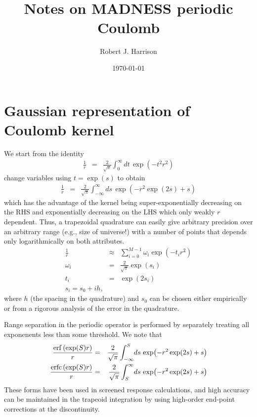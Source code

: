 \documentclass[12pt]{article}
\title{Notes on MADNESS periodic Coulomb}
\date{\today}
\author{Robert J. Harrison}
\DeclareMathOperator{\erfc}{erfc}
\begin{document}
\maketitle

\section{Gaussian representation of Coulomb kernel}

We start from the identity
\begin{eqnarray}
  \frac{1}{r} & = & \frac{2}{\sqrt{\pi}} \int_0^\infty \! dt \, \exp(-t^2 r^2) 
\end{eqnarray}
change variables using $t=\exp(s)$ to obtain
\begin{eqnarray}
  \frac{1}{r} & = & \frac{2}{\sqrt{\pi}} \int_{-\infty}^\infty \! ds \,\exp(-r^2 \exp(2s) + s)
\end{eqnarray}
which has the advantage of the kernel being super-exponentially decreasing on the RHS and exponentially decreasing on the LHS which only weakly $r$ dependent.  Thus, a trapezoidal quadrature can easily give arbitrary precision over an arbitrary range (e.g., size of universe!) with a number of points that depends only logarithmically on both attributes.
\begin{eqnarray}
  \frac{1}{r} & \approx & \sum_{i=0}^{M-1} \omega_i \exp(-t_i r^2) \\
  \omega_i & = & \frac{2}{\sqrt{\pi}} \exp(s_i) \\
  t_i & = & \exp(2s_i) \\
  s_i = s_0 + i h,
\end{eqnarray}
where $h$ (the spacing in the quadrature) and $s_0$ can be chosen either empirically or from a rigorous analysis of the error in the quadrature.

Range separation in the periodic operator is performed by separately treating all exponenents less than some threshold.  We note that
\begin{eqnarray}
  \frac{\erf\left( \exp(S) r \right)}{r} & = & \frac{2}{\sqrt{\pi}} \int_{-\infty}^S \! ds \,\exp(-r^2 \exp(2s) + s) \\
  \frac{\erfc\left( \exp(S) r \right)}{r} & = & \frac{2}{\sqrt{\pi}} \int_S^\infty \! ds \,\exp(-r^2 \exp(2s) + s) \\
\end{eqnarray}
These forms have been used in screened response calculations, and high accuracy can be maintained in the trapeoid integration by using high-order end-point corrections at the discontinuity.
\end{document}
